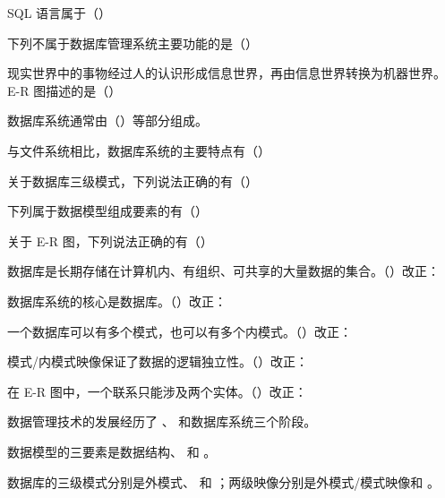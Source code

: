 \documentclass[a4paper,11pt]{article}
\begin{document}
\q SQL 语言属于（\quad）

\q 下列不属于数据库管理系统主要功能的是（\quad）

\q 现实世界中的事物经过人的认识形成信息世界，再由信息世界转换为机器世界。E-R 图描述的是（\quad）

\q 数据库系统通常由（\quad）等部分组成。

\q 与文件系统相比，数据库系统的主要特点有（\quad）

\q 关于数据库三级模式，下列说法正确的有（\quad）

\q 下列属于数据模型组成要素的有（\quad）

\q 关于 E-R 图，下列说法正确的有（\quad）

\q 数据库是长期存储在计算机内、有组织、可共享的大量数据的集合。\quad（\quad）\quad 改正：\fixblank

\q 数据库系统的核心是数据库。\quad（\quad）\quad 改正：\fixblank

\q 一个数据库可以有多个模式，也可以有多个内模式。\quad（\quad）\quad 改正：\fixblank

\q 模式/内模式映像保证了数据的逻辑独立性。\quad（\quad）\quad 改正：\fixblank

\q 在 E-R 图中，一个联系只能涉及两个实体。\quad（\quad）\quad 改正：\fixblank

\q 数据管理技术的发展经历了 \fillblank{}、\fillblank{} 和数据库系统三个阶段。

\q 数据模型的三要素是数据结构、\fillblank{} 和 \fillblank{}。

\q 数据库的三级模式分别是外模式、\fillblank{} 和 \fillblank{}；两级映像分别是外模式/模式映像和 \fillblank{}。
\end{document}
